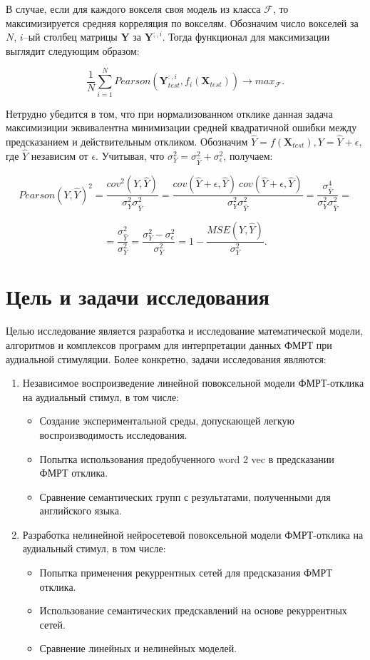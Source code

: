 \documentclass[pdftex,ptm,12pt,a4paper]{report}
\theoremstyle{definition}
\begin{document}
В случае, если для каждого вокселя своя модель из класса $\mathcal{F}$, то максимизируется средняя корреляция по вокселям. Обозначим число вокселей за $N$, $i$--ый столбец матрицы $\textbf{Y}$ за $\textbf{Y}^{;,i}$. Тогда функционал для максимизации выглядит следующим образом:

$$\frac{1}{N} \sum_{i=1}^{N} Pearson(\textbf{Y}_{test}^{:,i}, f_{i}(\textbf{X}_{test})) \rightarrow max_{\mathcal{F}}.$$

Нетрудно убедится в том, что при нормализованном отклике данная задача максимизиции эквивалентна минимизации средней квадратичной ошибки между предсказанием и действительным откликом. Обозначим $\hat{Y} = f(\mathbf{X}_{test}), Y = \hat{Y} + \epsilon,$ где $\hat{Y}$ независим от $\epsilon$. Учитывая, что $\sigma^2_{Y} = \sigma^2_{\hat{Y}} + \sigma^2_{\epsilon}$, получаем:

$$Pearson(Y, \hat{Y})^2 = \frac{cov^2(Y, \hat{Y})}{\sigma^2_{Y}\sigma^2_{\hat{Y}}} =  \frac{cov(\hat{Y} + \epsilon, \hat{Y})\ cov(\hat{Y} + \epsilon, \hat{Y})}{\sigma^2_{Y}\sigma^2_{\hat{Y}}} = \frac{\sigma^4_{\hat{Y}}}{\sigma^2_{Y}\sigma^2_{\hat{Y}}} = $$

$$= \frac{\sigma^2_{\hat{Y}}}{\sigma^2_{Y}} = \frac{\sigma^2_{Y} - \sigma^2_{\epsilon}}{\sigma^2_{Y}} = 1 - \frac{MSE(Y, \hat{Y})}{\sigma^2_{Y}}.$$


\section{Цель и задачи исследования}

Целью исследование является разработка и исследование
математической модели, алгоритмов и комплексов
программ для интерпретации данных ФМРТ при
аудиальной стимуляции. Более конкретно, задачи исследования являются:
\begin{enumerate}
\item Независимое воспроизведение линейной повоксельной модели ФМРТ-отклика на аудиальный стимул, в том числе:
\begin{itemize}
\item Создание экспериментальной среды, допускающей
легкую воспроизводимость исследования.
\item Попытка использования предобученного word 2 vec в предсказании ФМРТ отклика.
\item Сравнение семантических групп с результатами, полученными для английского языка.
\end{itemize}
\item Разработка нелинейной нейросетевой повоксельной
модели ФМРТ-отклика на аудиальный стимул, в том числе:
\begin{itemize}
\item Попытка применения рекуррентных сетей для предсказания ФМРТ отклика.
\item Использование семантических предскавлений на основе рекуррентных сетей.
\item Сравнение линейных и нелинейных моделей.
\end{itemize}
\end{enumerate}
\end{document}
